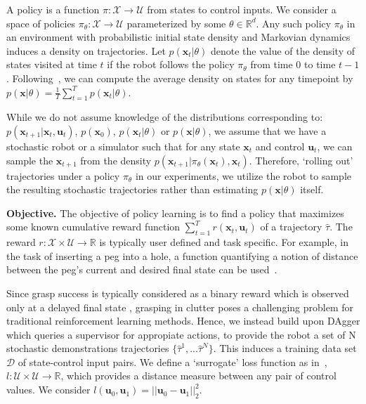 \documentclass[10pt, conference]{ieeeconf}      %
\newcommand{\bu}{\mathbf{u}}
\newcommand{\bx}{\mathbf{x}}
\begin{document}
A policy is a function $\pi: \mathcal{X} \to \mathcal{U}$ from states to control inputs. 
We consider a space of policies $\pi_{\theta}:\mathcal{X}\to \mathcal{U}$ parameterized by some $\theta\in \mathbb{R}^d$. Any such policy $\pi_{\theta}$ in an environment with probabilistic initial state density and Markovian dynamics
induces a density on trajectories. Let $p(\bx_t|\theta)$ denote the value of the density of states visited at time $t$ if the robot follows the policy $\pi_{\theta}$ from time $0$ to time $t-1$.  Following~\cite{ross2010reduction}, we can compute
the average density on states for any timepoint by $p(\bx|\theta) = \frac{1}{T} \sum^T_{t=1} p(\bx_t|\theta)$.

While we do not assume knowledge of the distributions corresponding to: $p(\bx_{t+1}|\bx_t,\bu_t)$, $p(\bx_0)$, $p(\bx_t|
\theta)$ or $p(\bx|\theta)$, we assume that we have a stochastic robot or a simulator such that for any state
$\bx_t$ and control $\bu_t$, we can sample the $\bx_{t+1}$ from the density $p(\bx_{t+1}|\pi_{\theta}(\bx_t),\bx_t)$. 
Therefore, `rolling out' trajectories under a policy
$\pi_{\theta}$ in our experiments, we utilize the robot to sample the resulting stochastic trajectories rather than
estimating $p(\bx|\theta)$ itself.

\noindent\textbf{Objective.} The objective of policy learning is to find a policy that maximizes some known cumulative
reward function $\sum^T_{t=1} r(\bx_t,\bu_t)$ of a trajectory $\hat{\tau}$. The reward $r:\mathcal{X}\times
\mathcal{U}\to \mathbb{R}$ is typically user defined and task specific. 
For example, in the task of inserting a peg into a hole, a function quantifying a notion of distance between the peg's
current and desired final state can be used~\cite{levine2015end}.  

Since grasp success is typically considered as a binary reward which is observed only at a delayed final state \cite{kitaevphysics}, 
grasping in clutter poses a challenging problem for traditional reinforcement learning methods. Hence, we instead build
upon DAgger which queries a supervisor for appropiate actions, to provide the robot a set of N stochastic demonstrations trajectories $\lbrace \hat{\tau}^1,...\hat{\tau}^N \rbrace$. This induces a training data set $\mathcal{D}$ of state-control input pairs. 
We define a `surrogate' loss function as in~\cite{ross2010reduction}, $l:\mathcal{U}\times \mathcal{U}\to \mathbb{R}$, which provides a distance
measure between any pair of control values. We consider $l(\bu_0,\bu_1) = ||\bu_0-\bu_1||^2_2$.
\end{document}
